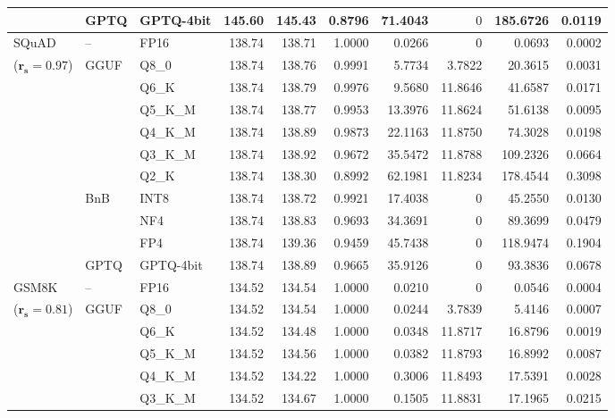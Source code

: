 \begin{longtable}{ll l rrrrrrr}
 & GPTQ & GPTQ-4bit & 145.60 & 145.43 & \cellcolor{red!18} 0.8796 & \cellcolor{red!18} 71.4043 & \cellcolor{cyan!12} $0$ & \cellcolor{red!18} 185.6726 & \cellcolor{red!18} 0.0119 \\
\midrule
SQuAD & -- & FP16 & 138.74 & 138.71 & 1.0000 & 0.0266 & \cellcolor{cyan!12} $0$ & 0.0693 & 0.0002 \\
{\small ($\mathbf{r_s{=}0.97}$)} & GGUF & Q8\_0 & 138.74 & 138.76 & 0.9991 & 5.7734 & 3.7822 & 20.3615 & 0.0031 \\
 &  & Q6\_K & 138.74 & 138.79 & 0.9976 & 9.5680 & 11.8646 & 41.6587 & 0.0171 \\
 &  & Q5\_K\_M & 138.74 & 138.77 & 0.9953 & 13.3976 & 11.8624 & 51.6138 & 0.0095 \\
 &  & Q4\_K\_M & 138.74 & 138.89 & 0.9873 & 22.1163 & 11.8750 & 74.3028 & 0.0198 \\
 &  & Q3\_K\_M & 138.74 & 138.92 & 0.9672 & 35.5472 & 11.8788 & 109.2326 & 0.0664 \\
 &  & Q2\_K & 138.74 & 138.30 & \cellcolor{red!18} 0.8992 & \cellcolor{red!18} 62.1981 & 11.8234 & \cellcolor{red!18} 178.4544 & \cellcolor{red!18} 0.3098 \\
 & BnB & INT8 & 138.74 & 138.72 & 0.9921 & 17.4038 & \cellcolor{cyan!12} $0$ & 45.2550 & 0.0130 \\
 &  & NF4 & 138.74 & 138.83 & 0.9693 & 34.3691 & \cellcolor{cyan!12} $0$ & 89.3699 & 0.0479 \\
 &  & FP4 & 138.74 & 139.36 & \cellcolor{red!18} 0.9459 & \cellcolor{red!18} 45.7438 & \cellcolor{cyan!12} $0$ & \cellcolor{red!18} 118.9474 & \cellcolor{red!18} 0.1904 \\
 & GPTQ & GPTQ-4bit & 138.74 & 138.89 & 0.9665 & 35.9126 & \cellcolor{cyan!12} $0$ & 93.3836 & 0.0678 \\
\midrule
GSM8K & -- & FP16 & 134.52 & 134.54 & 1.0000 & 0.0210 & \cellcolor{cyan!12} $0$ & 0.0546 & 0.0004 \\
{\small ($\mathbf{r_s{=}0.81}$)} & GGUF & Q8\_0 & 134.52 & 134.54 & 1.0000 & 0.0244 & 3.7839 & 5.4146 & 0.0007 \\
 &  & Q6\_K & 134.52 & 134.48 & 1.0000 & 0.0348 & 11.8717 & 16.8796 & 0.0019 \\
 &  & Q5\_K\_M & 134.52 & 134.56 & 1.0000 & 0.0382 & 11.8793 & 16.8992 & 0.0087 \\
 &  & Q4\_K\_M & 134.52 & 134.22 & 1.0000 & 0.3006 & 11.8493 & 17.5391 & 0.0028 \\
 &  & Q3\_K\_M & 134.52 & 134.67 & 1.0000 & 0.1505 & 11.8831 & 17.1965 & 0.0215 \\

\end{longtable}
